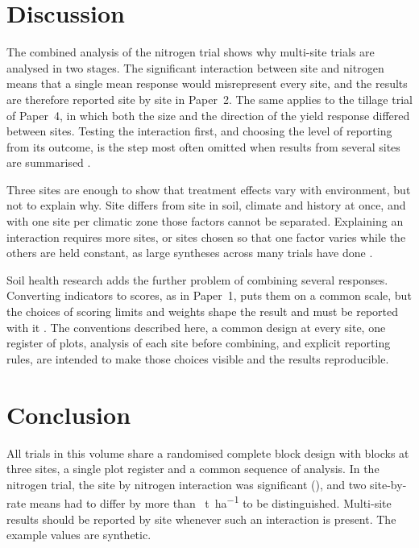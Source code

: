\section{Discussion}

The combined analysis of the nitrogen trial shows why multi-site trials are
analysed in two stages. The significant interaction between site and nitrogen
means that a single mean response would misrepresent every site, and the
results are therefore reported site by site in Paper~2. The same applies to
the tillage trial of Paper~4, in which both the size and the direction of the
yield response differed between sites. Testing the interaction first, and
choosing the level of reporting from its outcome, is the step most often
omitted when results from several sites are summarised \parencite{gomez1984}.

Three sites are enough to show that treatment effects vary with environment,
but not to explain why. Site differs from site in soil, climate and history at
once, and with one site per climatic zone those factors cannot be separated.
Explaining an interaction requires more sites, or sites chosen so that one
factor varies while the others are held constant, as large syntheses across
many trials have done \parencite{pittelkow2015}.

Soil health research adds the further problem of combining several responses.
Converting indicators to scores, as in Paper~1, puts them on a common scale,
but the choices of scoring limits and weights shape the result and must be
reported with it \parencite{andrews2004,bunemann2018}. The conventions
described here, a common design at every site, one register of plots, analysis
of each site before combining, and explicit reporting rules, are intended to
make those choices visible and the results reproducible.

\section{Conclusion}

All trials in this volume share a randomised complete block design with 
blocks at three sites, a single plot register and a common sequence of
analysis. In the nitrogen trial, the site by nitrogen interaction was
significant (), and two site-by-rate means had to
differ by more than ~\si{\tonne\per\hectare} to be distinguished.
Multi-site results should be reported by site whenever such an interaction is
present. The example values are synthetic.
